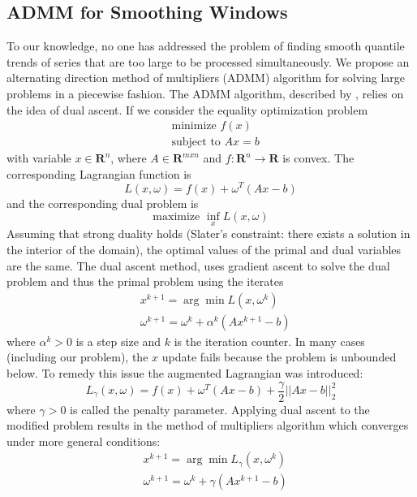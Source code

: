 \documentclass[12pt]{article}
\begin{document}
	\subsection{ADMM for Smoothing Windows}
	
	To our knowledge, no one has addressed the problem of finding smooth quantile trends of series that are too large to be processed simultaneously. We propose an alternating direction method of multipliers (ADMM) algorithm for solving large problems in a piecewise fashion. The ADMM algorithm, described by \cite{boyd2011distributed}, relies on the idea of dual ascent. If we consider the equality optimization problem 
	\begin{align}
	&\text{minimize } f(x)\\
	&\text{subject to } Ax = b
	\end{align}
	with variable $x\in \mathbf{R}^n$, where $A \in \mathbf{R}^{mxn}$ and $f: \mathbf{R}^n \rightarrow \mathbf{R}$ is convex. The corresponding Lagrangian function is 
	\begin{equation}
	L(x,\omega) = f(x) + \omega^T(Ax-b)
	\end{equation}
	and the corresponding dual problem  is 
	\begin{equation}
	\text{maximize } \inf_x L(x,\omega)
	\end{equation}
	Assuming that strong duality holds (Slater's constraint: there exists a solution in the interior of the domain), the optimal values of the primal and dual variables are the same. The dual ascent method, uses gradient ascent to solve the dual problem and thus the primal problem using the iterates
	\begin{align}
	&x^{k+1} = \arg\min L(x, \omega^k)\\
	&\omega^{k+1} = \omega^k + \alpha^k(Ax^{k+1} - b)
	\end{align}
	where $\alpha^k > 0$ is a step size and $k$ is the iteration counter. In many cases (including our problem), the $x$ update fails because the problem is unbounded below. To remedy this issue the augmented Lagrangian was introduced:
	\begin{equation}
	L_{\gamma}(x,\omega) = f(x)+\omega^T(Ax-b) + \frac{\gamma}{2}||Ax-b||_2^2
	\end{equation}
	where $\gamma > 0$ is called the penalty parameter. Applying dual ascent to the modified problem results in the method of multipliers algorithm which converges under more general conditions:
	\begin{align}
	&x^{k+1} = \arg\min L_\gamma(x, \omega^k)\\
	&\omega^{k+1} = \omega^k + \gamma(Ax^{k+1} - b)
	\end{align}
\end{document}
